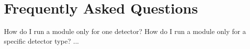 \section{Frequently Asked Questions}
How do I run a module only for one detector?
How do I run a module only for a specific detector type?
...
